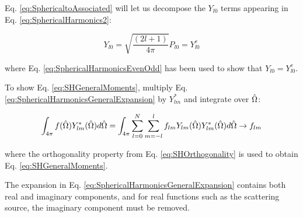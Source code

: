 Eq. \eqref{eq:SphericaltoAssociated} will let us decompose the \(Y_{l0}\) terms appearing in Eq. \eqref{eq:SphericalHarmonics2}:

\begin{equation}
Y_{l0}=\sqrt{\frac{(2l+1)}{4\pi}}P_{l0}= Y_{l0}^e
\end{equation}

where Eq. \eqref{eq:SphericalHarmonicsEvenOdd} has been used to show that \(Y_{l0}=Y_{l0}^e\).

\begin{tcolorbox}[breakable]
To show Eq. \eqref{eq:SHGeneralMoments}, multiply Eq. \eqref{eq:SphericalHarmonicsGeneralExpansion} by \(Y_{lm}^{*}\) and integrate over \(\hat{\Omega}  \):

\begin{equation}
\int_{4\pi}^{}f(\hat{\Omega}  )Y_{lm}^{*}(\hat{\Omega}  )d\hat{\Omega}  =\int_{4\pi}^{}\sum_{l=0}^{N}\sum_{m=-l}^{l}f_{lm}Y_{lm}(\hat{\Omega}  )Y_{lm}^{*}(\hat{\Omega}  )d\hat{\Omega}  \rightarrow f_{lm}
\end{equation}

where the orthogonality property from Eq. \eqref{eq:SHOrthogonality} is used to obtain Eq. \eqref{eq:SHGeneralMoments}.
\end{tcolorbox}

The expansion in Eq. \eqref{eq:SphericalHarmonicsGeneralExpansion} contains both real and imaginary components, and for real functions such as the scattering source, the imaginary component must be removed. 


